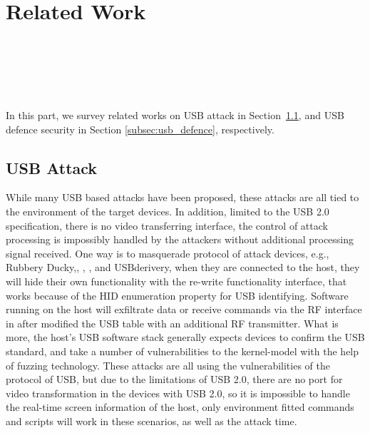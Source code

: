 \section{Related Work}
\label{sec:related_work}
\\
\\
\\
\\
\\

In this part, we survey related works on USB attack in Section~\ref{subsec:usb_attack}, and USB defence security in Section \ref{subsec:usb_defence}, respectively.

\subsection{USB Attack}
\label{subsec:usb_attack}
While many USB based attacks have been proposed, these attacks are all tied to the environment of the target devices. In addition, limited to the USB 2.0\cite{usb20} specification, there is no video transferring interface, the control of attack processing is impossibly handled by the attackers without additional processing signal received. One way is to masquerade protocol of attack devices, e.g., Rubbery Ducky\cite{rubber},\cite{badusb}, \cite{rubberducky2020}, \cite{usbbypassing}, \cite{iseeyou}and USBderivery\cite{usbdriver}, when they are connected to the host, they will hide their own functionality with the re-write functionality interface, that works because of the HID enumeration property for USB identifying. Software running on the host will exfiltrate data or receive commands via the RF interface in \cite{turnip} after modified the USB table with an additional RF transmitter. What is more, the host's USB software stack generally expects devices to confirm the USB standard, \cite{facedancer} and \cite{syzkaller} take a number of vulnerabilities to the kernel-model with the help of fuzzing technology. These attacks are all using the vulnerabilities of the protocol of USB, but due to the limitations of USB 2.0, there are no port for video transformation in the devices with USB 2.0, so it is impossible to handle the real-time screen information of the host, only environment fitted commands and scripts will work in these scenarios, as well as the attack time.

